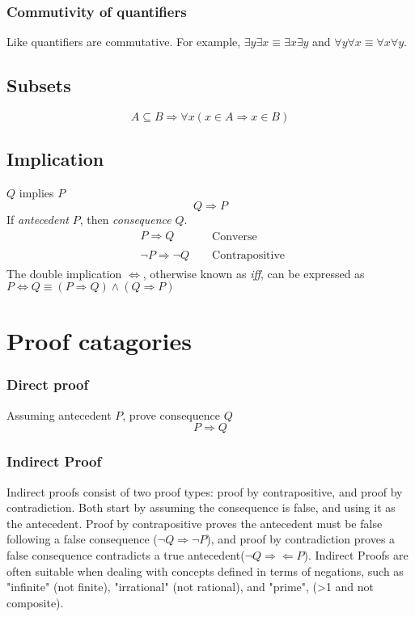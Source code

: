 \documentclass{article}
\begin{document}
\subsubsection{Commutivity of quantifiers}
Like quantifiers are commutative. For example, \(\exists y\exists x\equiv\exists x\exists y\) and \(\forall y\forall x\equiv\forall x\forall y\).
\subsection{Subsets}
\begin{displaymath}
	A\subseteq B\Rightarrow \forall x(x\in A\Rightarrow x\in B)
\end{displaymath}
\subsection{Implication}
\(Q\) implies \(P\)
\begin{displaymath}
	Q\Rightarrow P
\end{displaymath}
If \emph{antecedent} \(P\), then \emph{consequence} \(Q\).
\begin{align*}
	&P\Rightarrow Q &&\begin{aligned}\text{Converse}\end{aligned}\\
	&\neg P\Rightarrow\neg Q &&\begin{aligned}\text{Contrapositive}\end{aligned}
\end{align*}
The double implication \(\Leftrightarrow\), otherwise known as \emph{iff}, can be expressed as \(P\Leftrightarrow Q\equiv(P\Rightarrow Q)\wedge(Q\Rightarrow P)\)
\section{Proof catagories}
\subsubsection{Direct proof}
Assuming antecedent \(P\), prove consequence \(Q\)
\begin{displaymath}
	P\Rightarrow Q
\end{displaymath}
\subsubsection{Indirect Proof}
Indirect proofs consist of two proof types: proof by contrapositive, and proof by contradiction. Both start by assuming the consequence is false, and using it as the antecedent. Proof by contrapositive proves the antecedent must be false following a false consequence (\(\neg Q\Rightarrow\neg P\)), and proof by contradiction proves a false consequence contradicts a true antecedent(\(\neg Q\Rightarrow\!\Leftarrow P\)). Indirect Proofs are often suitable when dealing with concepts defined in terms of negations, such as "infinite" (not finite), "irrational" (not rational), and "prime", (>1 and not composite).
\begin{displaymath}
\end{displaymath}
\end{document}
